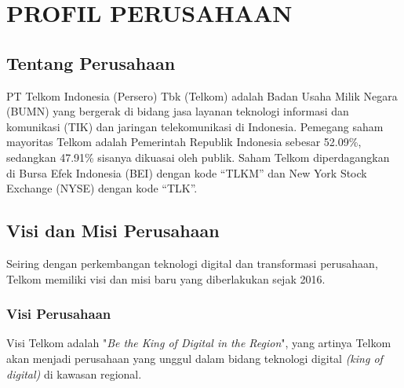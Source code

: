 \chapter{PROFIL PERUSAHAAN}
\section{Tentang Perusahaan}
\tab PT Telkom Indonesia (Persero) Tbk (Telkom) adalah Badan Usaha Milik Negara (BUMN) yang bergerak di bidang jasa layanan teknologi informasi dan komunikasi (TIK) dan jaringan telekomunikasi di Indonesia. Pemegang saham mayoritas Telkom adalah Pemerintah Republik Indonesia sebesar 52.09\%, sedangkan 47.91\% sisanya dikuasai oleh publik. Saham Telkom diperdagangkan di Bursa Efek Indonesia (BEI) dengan kode “TLKM” dan New York Stock Exchange (NYSE) dengan kode “TLK”.

\section{Visi dan Misi Perusahaan}
\tab Seiring dengan perkembangan teknologi digital dan transformasi perusahaan, Telkom memiliki visi dan misi baru yang diberlakukan sejak 2016.
\subsection{Visi Perusahaan}
\tab Visi Telkom adalah "\textit{Be the King of Digital in the Region}", yang artinya Telkom akan menjadi perusahaan yang unggul dalam bidang teknologi digital \textit{(king of digital)} di kawasan regional.
